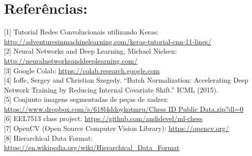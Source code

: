     \section{Referências:}\label{referencias}

[1] Tutorial Redes Convolucionais utilizando
Keras:
\href{http://adventuresinmachinelearning.com/keras-tutorial-cnn-11-lines/}{
http://adventuresinmachinelearning.com/keras-tutorial-cnn-11-lines/}\\

[2] Neural Networks and Deep Learning, Michael Nielsen:
\href{http://neuralnetworksanddeeplearning.com/}{http://neuralnetworksanddeeplearning.com/}\\

[3] Google Colab:
\href{https://colab.research.google.com}{https://colab.research.google.com}\\

[4] Ioffe, Sergey and Christian Szegedy. “Batch Normalization: Accelerating Deep Network Training by Reducing Internal Covariate Shift.” ICML (2015).\\

[5] Conjunto imagens segmentadas de peças de xadrez:
\href{https://www.dropbox.com/s/618l4ddoykotmru/Chess\%20ID\%20Public\%20Data.zip?dl=0}{
https://www.dropbox.com/s/618l4ddoykotmru/Chess ID Public Data.zip?dl=0}\\

[6] EEL7513 class project:
\href{https://github.com/andidevel/ml-chess}{https://github.com/andidevel/ml-chess}\\

[7] OpenCV (Open Source Computer Vision Library):
\href{https://opencv.org/}{https://opencv.org/}\\

[8] Hierarchical Data Format:
\href{https://en.wikipedia.org/wiki/Hierarchical_Data_Format}{https://en.wikipedia.org/wiki/Hierarchical\_Data\_Format}\\

    
